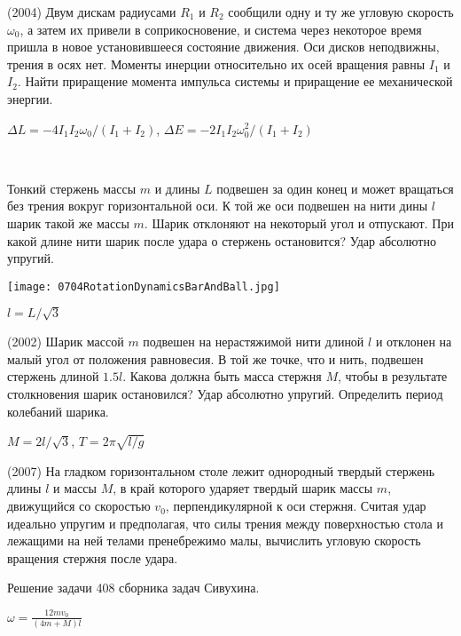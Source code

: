 \begin{ex}
(2004) Двум дискам радиусами $R_1$ и $R_2$ сообщили одну и ту же угловую скорость $\omega_0$, а затем их привели в соприкосновение, и система через некоторое время пришла в новое установившееся состояние движения. Оси дисков неподвижны, трения в осях нет. Моменты инерции относительно их осей вращения равны $I_1$ и $I_2$. Найти приращение момента импульса системы и приращение ее механической энергии.
\begin{ans}
$\Delta L = -4I_1I_2\omega_0/(I_1+I_2)$, $\Delta E = -2I_1I_2\omega_0^2/(I_1+I_2)$
\end{ans}
\end{ex}

\begin{ex}
\hspace{0pt} \\
\begin{minipage}{.65\textwidth}
Тонкий стержень массы $m$ и длины $L$ подвешен за один конец и может вращаться без трения вокруг горизонтальной оси. К той же оси подвешен на нити дины $l$ шарик такой же массы $m$. Шарик отклоняют на некоторый угол и отпускают. При какой длине нити шарик после удара о стержень остановится? Удар абсолютно упругий.
\end{minipage}
\begin{minipage}{.35\textwidth}
\centering
\texttt{[image: 0704RotationDynamicsBarAndBall.jpg]}
\end{minipage}
\begin{ans}
$l = L/\sqrt{3}$
\end{ans}
\end{ex}

\begin{ex}
(2002) Шарик массой $m$ подвешен на нерастяжимой нити длиной $l$ и отклонен на малый угол от положения равновесия. В той же точке, что и нить, подвешен стержень длиной $1.5l$. Какова должна быть масса стержня $M$, чтобы в результате столкновения шарик остановился? Удар абсолютно упругий. Определить период колебаний шарика.
\begin{ans}
$M=2l/\sqrt{3}$, $T = 2\pi \sqrt{l/g}$
\end{ans}
\end{ex}

\begin{ex}
(2007) На гладком горизонтальном столе лежит однородный твердый стержень длины $l$ и массы $M$, в край которого ударяет твердый шарик массы $m$, движущийся со скоростью $v_0$, перпендикулярной к оси стержня. Считая удар идеально упругим и предполагая, что силы трения между поверхностью стола и лежащими на ней телами пренебрежимо малы, вычислить угловую скорость вращения стержня после удара.
\begin{sol}
Решение задачи 408 сборника задач Сивухина.
\end{sol}
\begin{ans}
$\omega = \frac{12mv_0}{(4m+M)l}$
\end{ans}
\end{ex}

